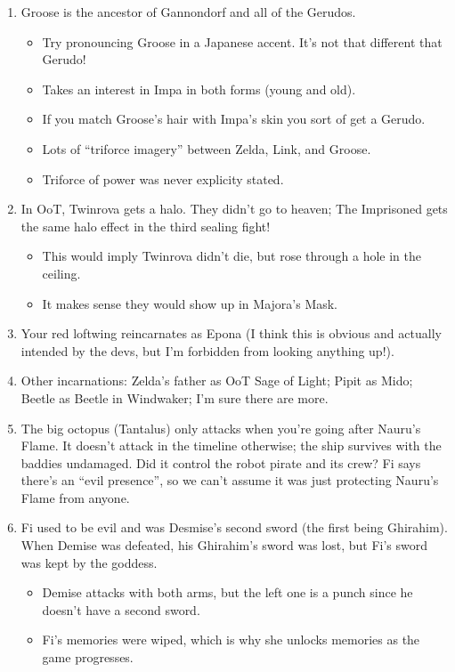 \begin{enumerate}
	\item{Groose is the ancestor of Gannondorf and all of the Gerudos.
		\begin{itemize}
			\item{Try pronouncing Groose in a Japanese accent. It's not that different that Gerudo!}
			\item{Takes an interest in Impa in both forms (young and old).}
			\item{If you match Groose's hair with Impa's skin you sort of get a Gerudo.}
			\item{Lots of ``triforce imagery'' between Zelda, Link, and Groose.} 
			\item{Triforce of power was never explicity stated.}
		\end{itemize}
	}
	\item{In OoT, Twinrova gets a halo. They didn't go to heaven; The Imprisoned gets the same halo effect in the third sealing fight!
		\begin{itemize}
			\item{This would imply Twinrova didn't die, but rose through a hole in the ceiling.}
			\item{It makes sense they would show up in Majora's Mask.}
		\end{itemize}
	}
	\item{Your red loftwing reincarnates as Epona (I think this is obvious and actually intended by the devs, but I'm forbidden from looking anything up!).}
	\item{Other incarnations: Zelda's father as OoT Sage of Light; Pipit as Mido; Beetle as Beetle in Windwaker; I'm sure there are more.}
	\item{The big octopus (Tantalus) only attacks when you're going after Nauru's Flame. It doesn't attack in the timeline otherwise; the ship survives with the baddies undamaged. Did it control the robot pirate and its crew? Fi says there's an ``evil presence'', so we can't assume it was just protecting Nauru's Flame from anyone.}
	\item{Fi used to be evil and was Desmise's second sword (the first being Ghirahim). When Demise was defeated, his Ghirahim's sword was lost, but Fi's sword was kept by the goddess.
		\begin{itemize}
			\item{Demise attacks with both arms, but the left one is a punch since he doesn't have a second sword.}
			\item{Fi's memories were wiped, which is why she unlocks memories as the game progresses.}

\end{itemize}}
\end{enumerate}
